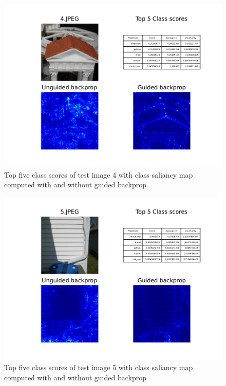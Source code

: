 \documentclass{article}
\begin{document}
\begin{figure}[h]
    \begin{center}
        \includegraphics{../Task2/Figures/4.JPEG_k10_saliancy_uncertainty.pdf}
        \caption{Top five class scores of test image 4 with class saliancy map computed with and without guided backprop}
        \label{fig::image4}
    \end{center}
\end{figure}
\begin{figure}[h]
    \begin{center}
        \includegraphics{../Task2/Figures/5.JPEG_k10_saliancy_uncertainty.pdf}
        \caption{Top five class scores of test image 5 with class saliancy map computed with and without guided backprop}
        \label{fig::image5}
    \end{center}
\end{figure}
\end{document}
